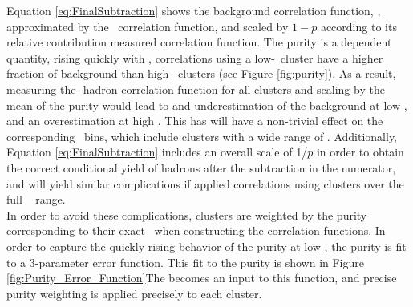 Equation \ref{eq:FinalSubtraction} shows the background correlation function, \CB, approximated by the \ydecay~correlation function, and scaled by $1-p$ according to its relative contribution measured correlation function. The purity is a \pt dependent quantity, rising quickly with \pt, correlations using a low-\pt~cluster have a higher fraction of background than high-\pt~clusters (see Figure \ref{fig:purity}). As a result, measuring the \ydecay-hadron correlation function for all clusters and scaling by the mean of the purity would lead to and underestimation of the background at low \ptcluster, and an overestimation at high \ptcluster. This has will have a non-trivial effect on the corresponding \zt~bins, which include clusters with a wide range of \ptcluster. Additionally,  Equation \ref{eq:FinalSubtraction} includes an overall scale of 1/$p$ in order to obtain the correct conditional yield of hadrons after the subtraction in the numerator, and will yield similar complications if applied correlations using clusters over the full \ptcluster~ range.\\

In order to avoid these complications, clusters are weighted by the purity corresponding to their exact \ptcluster~when constructing the correlation functions. In order to capture the quickly rising behavior of the purity at low \ptcluster, the purity is fit to a 3-parameter error function. This fit to the purity is shown in Figure \ref{fig:Purity_Error_Function}The \ptcluster becomes an input to this function, and precise purity weighting is applied precisely to each cluster. 

